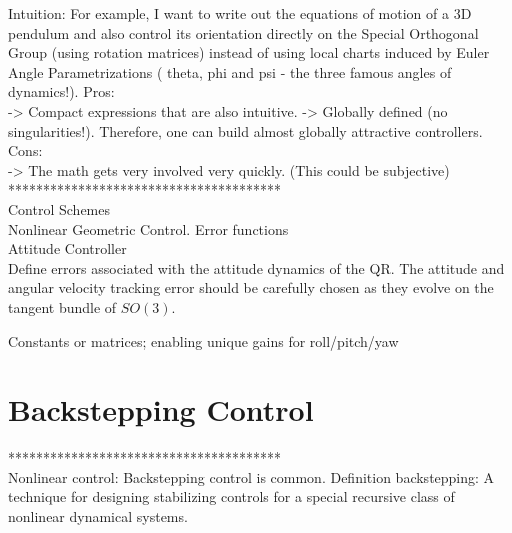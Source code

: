 Intuition:  For example, I want to write out the equations of motion of a 3D pendulum and also control its orientation directly on the Special Orthogonal Group (using rotation matrices)  instead of using local charts induced by Euler Angle Parametrizations ( theta, phi and psi - the three famous angles of dynamics!).
Pros:\\
->  Compact expressions that are also intuitive.
-> Globally defined (no singularities!). Therefore, one can build almost globally attractive controllers.\\
Cons:\\
-> The math gets very involved very quickly. (This could be subjective)
***************************************\\

Control Schemes\\
Nonlinear Geometric Control. Error functions\\

Attitude Controller\\

Define errors associated with the attitude dynamics of the QR. The attitude and angular velocity tracking error should be carefully chosen as they evolve on the tangent bundle of  $ SO(3) $. \cite{Lee 2010c} 


Constants \cite{Lee2010} or matrices; enabling unique gains for roll/pitch/yaw \cite{Mellinger2011}\\

\section{Backstepping Control}

***************************************\\
Nonlinear control: Backstepping control is common.
Definition backstepping: A technique for designing stabilizing controls for a special recursive class of nonlinear dynamical systems.

